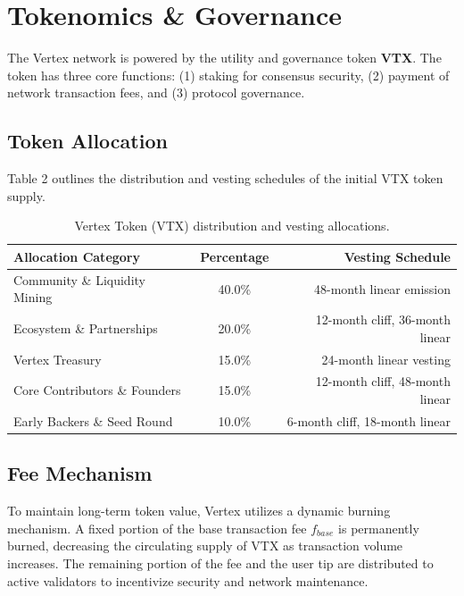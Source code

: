 \section{Tokenomics \& Governance}
The Vertex network is powered by the utility and governance token \textbf{VTX}. The token has three core functions: (1) staking for consensus security, (2) payment of network transaction fees, and (3) protocol governance.

\subsection{Token Allocation}
Table 2 outlines the distribution and vesting schedules of the initial VTX token supply.

\begin{table}[H]
\centering
\sffamily
\small
\begin{tabularx}{0.9\textwidth}{Xcr}
\toprule
\textbf{Allocation Category} & \textbf{Percentage} & \textbf{Vesting Schedule} \\
\midrule
Community \& Liquidity Mining & 40.0\% & 48-month linear emission \\
Ecosystem \& Partnerships & 20.0\% & 12-month cliff, 36-month linear \\
Vertex Treasury & 15.0\% & 24-month linear vesting \\
Core Contributors \& Founders & 15.0\% & 12-month cliff, 48-month linear \\
Early Backers \& Seed Round & 10.0\% & 6-month cliff, 18-month linear \\
\bottomrule
\end{tabularx}
\caption{Vertex Token (VTX) distribution and vesting allocations.}
\label{tab:tokenomics}
\end{table}

\subsection{Fee Mechanism}
To maintain long-term token value, Vertex utilizes a dynamic burning mechanism. A fixed portion of the base transaction fee $f_{base}$ is permanently burned, decreasing the circulating supply of VTX as transaction volume increases. The remaining portion of the fee and the user tip are distributed to active validators to incentivize security and network maintenance.
